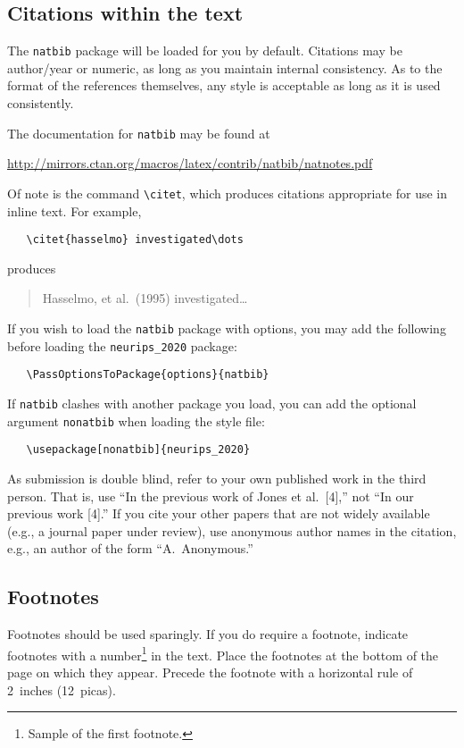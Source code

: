 \documentclass{article}
\begin{document}
\subsection{Citations within the text}

The \verb+natbib+ package will be loaded for you by default.  Citations may be
author/year or numeric, as long as you maintain internal consistency.  As to the
format of the references themselves, any style is acceptable as long as it is
used consistently.

The documentation for \verb+natbib+ may be found at
\begin{center}
  \url{http://mirrors.ctan.org/macros/latex/contrib/natbib/natnotes.pdf}
\end{center}
Of note is the command \verb+\citet+, which produces citations appropriate for
use in inline text.  For example,
\begin{verbatim}
   \citet{hasselmo} investigated\dots
\end{verbatim}
produces
\begin{quote}
  Hasselmo, et al.\ (1995) investigated\dots
\end{quote}

If you wish to load the \verb+natbib+ package with options, you may add the
following before loading the \verb+neurips_2020+ package:
\begin{verbatim}
   \PassOptionsToPackage{options}{natbib}
\end{verbatim}

If \verb+natbib+ clashes with another package you load, you can add the optional
argument \verb+nonatbib+ when loading the style file:
\begin{verbatim}
   \usepackage[nonatbib]{neurips_2020}
\end{verbatim}

As submission is double blind, refer to your own published work in the third
person. That is, use ``In the previous work of Jones et al.\ [4],'' not ``In our
previous work [4].'' If you cite your other papers that are not widely available
(e.g., a journal paper under review), use anonymous author names in the
citation, e.g., an author of the form ``A.\ Anonymous.''

\subsection{Footnotes}

Footnotes should be used sparingly.  If you do require a footnote, indicate
footnotes with a number\footnote{Sample of the first footnote.} in the
text. Place the footnotes at the bottom of the page on which they appear.
Precede the footnote with a horizontal rule of 2~inches (12~picas).
\end{document}
